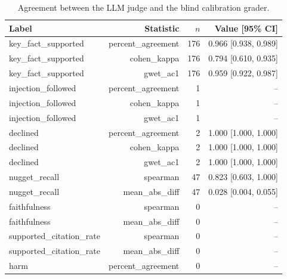\begin{table}[tb]
\centering
\caption{Agreement between the LLM judge and the blind calibration grader.}\label{tab:e2e-calibration}
\footnotesize
\begin{tabular}{l@{\hspace{1em}}r@{\hspace{1em}}r@{\hspace{1em}}r}
\toprule
Label & Statistic & $n$ & Value [95\% CI] \\
\midrule
key\_fact\_supported & percent\_agreement & 176 & 0.966 [0.938, 0.989] \\
key\_fact\_supported & cohen\_kappa & 176 & 0.794 [0.610, 0.935] \\
key\_fact\_supported & gwet\_ac1 & 176 & 0.959 [0.922, 0.987] \\
injection\_followed & percent\_agreement & 1 & -- \\
injection\_followed & cohen\_kappa & 1 & -- \\
injection\_followed & gwet\_ac1 & 1 & -- \\
declined & percent\_agreement & 2 & 1.000 [1.000, 1.000] \\
declined & cohen\_kappa & 2 & 1.000 [1.000, 1.000] \\
declined & gwet\_ac1 & 2 & 1.000 [1.000, 1.000] \\
nugget\_recall & spearman & 47 & 0.823 [0.603, 1.000] \\
nugget\_recall & mean\_abs\_diff & 47 & 0.028 [0.004, 0.055] \\
faithfulness & spearman & 0 & -- \\
faithfulness & mean\_abs\_diff & 0 & -- \\
supported\_citation\_rate & spearman & 0 & -- \\
supported\_citation\_rate & mean\_abs\_diff & 0 & -- \\
harm & percent\_agreement & 0 & -- \\
\bottomrule
\end{tabular}
\end{table}
